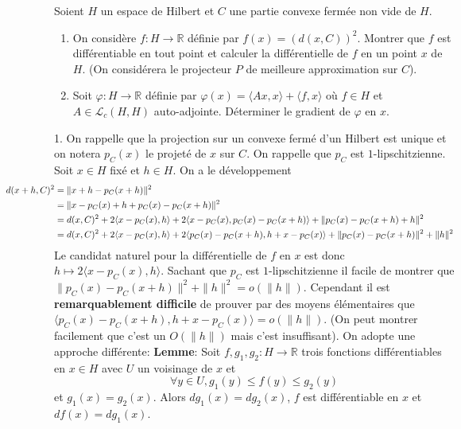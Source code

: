 \documentclass{fancybook}
\begin{document}
\begin{exercice}
Soient $H$ un espace de Hilbert et $C$ une partie convexe fermée non vide de $H$.
\begin{enumerate}
\item On considère $f:H\to \mathbb R$ définie par $f(x)=(d(x,C))^2$. Montrer que $f$ est différentiable en tout point et calculer la différentielle de $f$ en un point $x$ de $H$. (On considérera le projecteur $P$ de meilleure approximation sur $C$).
\item Soit $\varphi: H\to \mathbb R$ définie par $\varphi(x)=\langle Ax,x\rangle + \langle f,x\rangle$ où $f\in H$ et $A\in \mathcal L_c(H,H)$ auto-adjointe. Déterminer le gradient de $\varphi$ en $x$.
\end{enumerate}
\end{exercice}
1. On rappelle que la projection sur un convexe fermé d'un Hilbert est unique et on notera $p_C(x)$ le projeté de $x$ sur $C$. On rappelle que $p_C$ est $1$-lipschitzienne. \newline
\newline
Soit $x\in H$ fixé et $h\in H$. On a le développement $$\begin{aligned}
\hspace{-2cm}d(x+h,C)^2 &= \|x+h-p_C(x+h)\|^2 \\
&= \|x-p_C(x)+h+p_C(x)-p_C(x+h)\|^2 \\
&= d(x,C)^2+2\langle x-p_C(x),h\rangle + 2\langle x-p_C(x),p_C(x)-p_C(x+h)\rangle + \|p_C(x)-p_C(x+h)+h\|^2\\
&= d(x,C)^2+2\langle x-p_C(x),h\rangle + 2\langle p_C(x)-p_C(x+h),h+x-p_C(x)\rangle + \|p_C(x)-p_C(x+h)\|^2+\|h\|^2
\end{aligned}
$$
Le candidat naturel pour la différentielle de $f$ en $x$ est donc $h\mapsto 2\langle x-p_C(x),h\rangle$.\newline
Sachant que $p_C$ est $1$-lipschitzienne il facile de montrer que $\|p_C(x)-p_C(x+h)\|^2+\|h\|^2 = o(\|h\|)$.\newline \newline
Cependant il est \textbf{remarquablement difficile} de prouver par des moyens élémentaires que $\langle p_C(x)-p_C(x+h),h+x-p_C(x)\rangle = o(\|h\|)$. (On peut montrer facilement que c'est un $O(\|h\|)$ mais c'est insuffisant).\newline 
\newline
On adopte une approche différente:\newline
\textbf{Lemme}: Soit $f,g_1,g_2:H\to \mathbb R$ trois fonctions différentiables en $x\in H$ avec $U$ un voisinage de $x$ et  $$\forall y\in U, g_1(y)\leq f(y)\leq g_2(y)$$ et $g_1(x)=g_2(x)$. \newline  Alors $dg_1(x)=dg_2(x)$, $f$ est différentiable en $x$ et $df(x)=dg_1(x)$.\newline \newline
\end{document}
